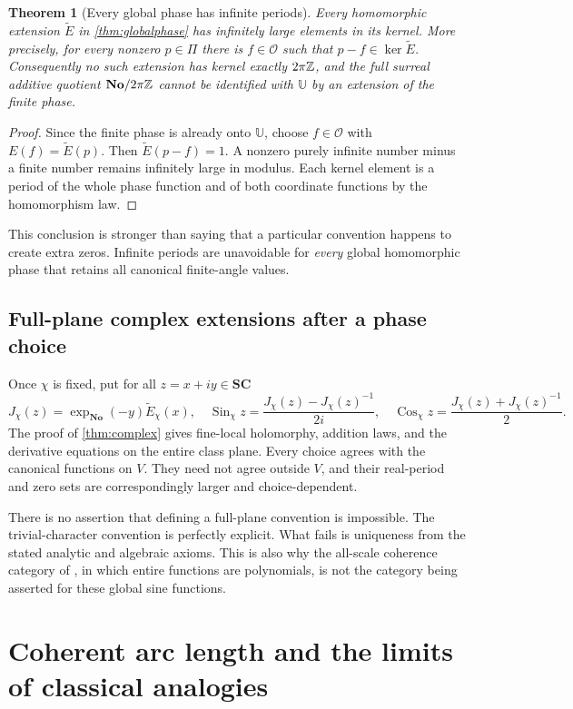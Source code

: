 \documentclass[11pt,letterpaper]{article}
\newtheorem{theorem}{Theorem}[section]
\theoremstyle{definition}
\theoremstyle{remark}
\newcommand{\No}{\mathbf{No}}
\newcommand{\SC}{\mathbf{SC}}
\newcommand{\OO}{\mathcal O}\newcommand{\mm}{\mathfrak m}
\newcommand{\U}{\mathbb U}\newcommand{\PP}{\mathbb P}
\newcommand{\Sin}{\operatorname{Sin}}\newcommand{\Cos}{\operatorname{Cos}}
\numberwithin{equation}{section}
\begin{document}
\begin{theorem}[Every global phase has infinite periods]\label{thm:infiniteperiods}
Every homomorphic extension $\widetilde E$ in \cref{thm:globalphase} has infinitely large elements in its kernel. More precisely, for every nonzero $p\in\Pi$ there is $f\in\OO$ such that $p-f\in\ker\widetilde E$. Consequently no such extension has kernel exactly $2\pi\mathbb Z$, and the full surreal additive quotient $\No/2\pi\Z$ cannot be identified with $\U$ by an extension of the finite phase.
\end{theorem}
\begin{proof}
Since the finite phase is already onto $\U$, choose $f\in\OO$ with $E(f)=\widetilde E(p)$. Then $\widetilde E(p-f)=1$. A nonzero purely infinite number minus a finite number remains infinitely large in modulus. Each kernel element is a period of the whole phase function and of both coordinate functions by the homomorphism law.
\end{proof}
This conclusion is stronger than saying that a particular convention happens to create extra zeros. Infinite periods are unavoidable for \emph{every} global homomorphic phase that retains all canonical finite-angle values.

\subsection{Full-plane complex extensions after a phase choice}
Once $\chi$ is fixed, put for all $z=x+iy\in\SC$
\[
 J_\chi(z)=\exp_\No(-y)\widetilde E_\chi(x),
 \quad
 \Sin_\chi z=\frac{J_\chi(z)-J_\chi(z)^{-1}}{2i},
 \quad
 \Cos_\chi z=\frac{J_\chi(z)+J_\chi(z)^{-1}}2.
\]
The proof of \cref{thm:complex} gives fine-local holomorphy, addition laws, and the derivative equations on the entire class plane. Every choice agrees with the canonical functions on $V$. They need not agree outside $V$, and their real-period and zero sets are correspondingly larger and choice-dependent.

There is no assertion that defining a full-plane convention is impossible. The trivial-character convention is perfectly explicit. What fails is uniqueness from the stated analytic and algebraic axioms. This is also why the all-scale coherence category of \cite{SourceAnalysis}, in which entire functions are polynomials, is not the category being asserted for these global sine functions.

\section{Coherent arc length and the limits of classical analogies}\label{sec:arclength}
\end{document}
